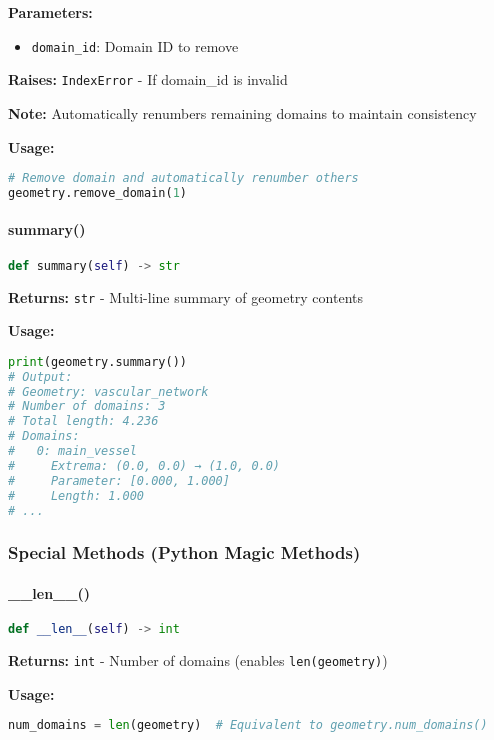 \textbf{Parameters:}
\begin{itemize}
    \item \texttt{domain\_id}: Domain ID to remove
\end{itemize}

\textbf{Raises:} \texttt{IndexError} - If domain\_id is invalid

\textbf{Note:} Automatically renumbers remaining domains to maintain consistency

\textbf{Usage:}
\begin{lstlisting}[language=Python]
# Remove domain and automatically renumber others
geometry.remove_domain(1)
\end{lstlisting}

\paragraph{summary()}
\begin{lstlisting}[language=Python, caption=Summary Generation Method]
def summary(self) -> str
\end{lstlisting}

\textbf{Returns:} \texttt{str} - Multi-line summary of geometry contents

\textbf{Usage:}
\begin{lstlisting}[language=Python]
print(geometry.summary())
# Output:
# Geometry: vascular_network
# Number of domains: 3
# Total length: 4.236
# Domains:
#   0: main_vessel
#     Extrema: (0.0, 0.0) → (1.0, 0.0)
#     Parameter: [0.000, 1.000]
#     Length: 1.000
# ...
\end{lstlisting}

\subsubsection{Special Methods (Python Magic Methods)}

\paragraph{\_\_len\_\_()}
\begin{lstlisting}[language=Python, caption=Length Support]
def __len__(self) -> int
\end{lstlisting}

\textbf{Returns:} \texttt{int} - Number of domains (enables \texttt{len(geometry)})

\textbf{Usage:}
\begin{lstlisting}[language=Python]
num_domains = len(geometry)  # Equivalent to geometry.num_domains()
\end{lstlisting}


